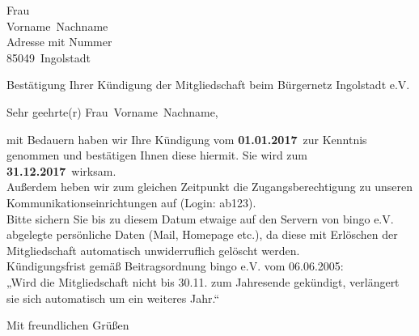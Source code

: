 \documentclass{bingoevletter}
\newcommand{\Anrede}{Frau}
\newcommand{\Vorname}{Vorname}
\newcommand{\Nachname}{Nachname}
\newcommand{\Adresse}{Adresse mit Nummer}
\newcommand{\PLZ}{85049}
\newcommand{\Ort}{Ingolstadt}
\newcommand{\EingangDatum}{01.01.2017}
\newcommand{\AustrittJahr}{2017}
\newcommand{\Login}{ab123}
\begin{document}
\begin{letter}{%
		\Anrede \\
		\Vorname \ \Nachname\\
		\Adresse\\
		\PLZ \ \Ort%
	}
	\opening{Bestätigung Ihrer Kündigung der Mitgliedschaft beim Bürgernetz Ingolstadt e.V.}
	
	Sehr geehrte(r) \Anrede \ \Vorname \ \Nachname, 
	
	mit Bedauern haben wir Ihre Kündigung vom \textbf{\EingangDatum}\ zur Kenntnis genommen und bestätigen Ihnen diese hiermit. Sie wird zum \textbf{31.12.\AustrittJahr}\ wirksam. \\
	
	Außerdem heben wir zum gleichen Zeitpunkt die Zugangsberechtigung zu unseren Kommunikationseinrichtungen auf (Login: \Login). \\
	Bitte sichern Sie bis zu diesem Datum etwaige auf den Servern von bingo e.V. abgelegte persönliche Daten (Mail, Homepage etc.), da diese mit Erlöschen der Mitgliedschaft automatisch unwiderruflich gelöscht werden. \\
	
	
	Kündigungsfrist gemäß Beitragsordnung bingo e.V. vom 06.06.2005: \\
	„Wird die Mitgliedschaft nicht bis 30.11. zum Jahresende gekündigt, 
	verlängert sie sich automatisch um ein weiteres Jahr.“ \\
	\closing{Mit freundlichen Grüßen}
\end{letter}	
\end{document}
